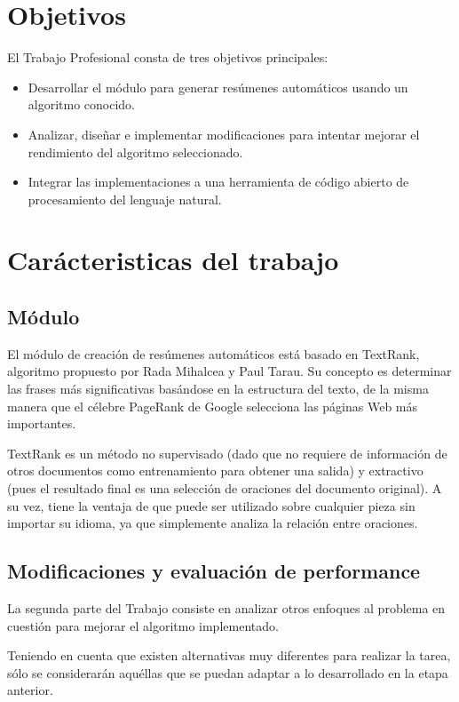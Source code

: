 \documentclass[12pt,a4paper]{article}
\begin{document}
\section{Objetivos}

El Trabajo Profesional consta de tres objetivos principales:
\begin{itemize}
    \item Desarrollar el módulo para generar resúmenes automáticos usando un algoritmo conocido.
    \item Analizar, diseñar e implementar modificaciones para intentar mejorar el rendimiento del algoritmo seleccionado.
    \item Integrar las implementaciones a una herramienta de código abierto de procesamiento del lenguaje natural.
\end{itemize}

\section{Carácteristicas del trabajo}
\subsection{Módulo}

El módulo de creación de resúmenes automáticos está basado en \mbox{TextRank},
algoritmo propuesto por Rada Mihalcea y Paul Tarau. Su concepto es determinar las frases más significativas basándose en la estructura del texto, de la misma manera que el célebre PageRank de Google selecciona las páginas Web más importantes. 

TextRank es un método no supervisado (dado que no requiere de información de otros documentos como entrenamiento para obtener una salida) y extractivo (pues el resultado final es una selección de oraciones del documento original). A su vez, tiene la ventaja de que puede ser utilizado sobre cualquier pieza sin importar su idioma, ya que simplemente analiza la relación entre oraciones.

\subsection{Modificaciones y evaluación de performance}

La segunda parte del Trabajo consiste en analizar otros enfoques al problema en cuestión para mejorar el algoritmo implementado. 

Teniendo en cuenta que existen alternativas muy diferentes para realizar la tarea, sólo se considerarán aquéllas que se puedan adaptar a lo desarrollado en la etapa anterior.
\end{document}
